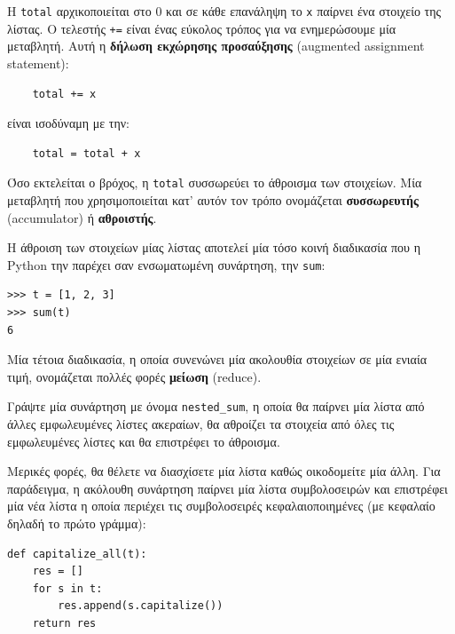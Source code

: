 \documentclass[10pt]{book}
\begin{document}
Η {\tt total} αρχικοποιείται στο 0 και σε κάθε επανάληψη το {\tt x} παίρνει ένα στοιχείο της λίστας. Ο τελεστής {\tt +=} είναι ένας εύκολος τρόπος για να ενημερώσουμε μία μεταβλητή. Αυτή η {\bf δήλωση εκχώρησης προσαύξησης} (augmented assignment statement):

\begin{verbatim}
    total += x
\end{verbatim}
%

είναι ισοδύναμη με την:

\begin{verbatim}
    total = total + x
\end{verbatim}
%

Όσο εκτελείται ο βρόχος, η {\tt total} συσσωρεύει το άθροισμα των στοιχείων.
Μία μεταβλητή που χρησιμοποιείται κατ' αυτόν τον τρόπο ονομάζεται {\bf συσσωρευτής} (accumulator) ή {\bf αθροιστής}.

Η άθροιση των στοιχείων μίας λίστας αποτελεί μία τόσο κοινή διαδικασία που η Python την παρέχει σαν ενσωματωμένη συνάρτηση, την {\tt sum}:

\begin{verbatim}
>>> t = [1, 2, 3]
>>> sum(t)
6
\end{verbatim}
%

Μία τέτοια διαδικασία, η οποία συνενώνει μία ακολουθία στοιχείων σε μία ενιαία τιμή, ονομάζεται πολλές φορές {\bf μείωση} (reduce).
\\


\begin{exercise}

Γράψτε μία συνάρτηση με όνομα \verb"nested_sum", η οποία θα παίρνει μία λίστα από άλλες εμφωλευμένες λίστες ακεραίων, θα αθροίζει τα στοιχεία από όλες τις εμφωλευμένες λίστες και θα επιστρέφει το άθροισμα.
\end{exercise}

Μερικές φορές, θα θέλετε να διασχίσετε μία λίστα καθώς οικοδομείτε μία άλλη. Για παράδειγμα, η ακόλουθη συνάρτηση παίρνει μία λίστα συμβολοσειρών και επιστρέφει μία νέα λίστα η οποία περιέχει τις συμβολοσειρές κεφαλαιοποιημένες (με κεφαλαίο δηλαδή το πρώτο γράμμα):

\begin{verbatim}
def capitalize_all(t):
    res = []
    for s in t:
        res.append(s.capitalize())
    return res
\end{verbatim}
%
\end{document}
